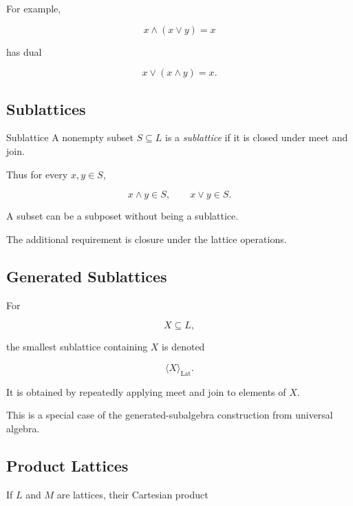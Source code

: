 For example,

\[ x\wedge(x\vee y)=x \]

has dual

\[ x\vee(x\wedge y)=x. \]

\subsection{Sublattices}
\label{subsec:sublattices}

\begin{definitionbox}{Sublattice}
A nonempty subset \(S\subseteq L\) is a \emph{sublattice} if it is closed
under meet and join.
\end{definitionbox}

Thus for every \(x,y\in S\),

\[ x\wedge y\in S,\qquad x\vee y\in S. \]

A subset can be a subposet without being a sublattice.

The additional requirement is closure under the lattice operations.

\subsection{Generated Sublattices}
\label{subsec:generated-sublattices}

For

\[ X\subseteq L, \]

the smallest sublattice containing \(X\) is denoted

\[ \langle X\rangle_{\mathrm{Lat}}. \]

It is obtained by repeatedly applying meet and join to elements of \(X\).

This is a special case of the generated-subalgebra construction from
universal algebra.

\subsection{Product Lattices}
\label{subsec:product-lattices}

If \(L\) and \(M\) are lattices, their Cartesian product

